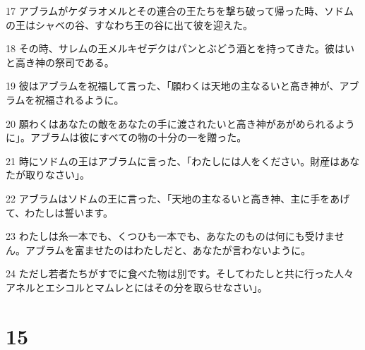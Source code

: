 \par 17 アブラムがケダラオメルとその連合の王たちを撃ち破って帰った時、ソドムの王はシャベの谷、すなわち王の谷に出て彼を迎えた。
\par 18 その時、サレムの王メルキゼデクはパンとぶどう酒とを持ってきた。彼はいと高き神の祭司である。
\par 19 彼はアブラムを祝福して言った、「願わくは天地の主なるいと高き神が、アブラムを祝福されるように。
\par 20 願わくはあなたの敵をあなたの手に渡されたいと高き神があがめられるように」。アブラムは彼にすべての物の十分の一を贈った。
\par 21 時にソドムの王はアブラムに言った、「わたしには人をください。財産はあなたが取りなさい」。
\par 22 アブラムはソドムの王に言った、「天地の主なるいと高き神、主に手をあげて、わたしは誓います。
\par 23 わたしは糸一本でも、くつひも一本でも、あなたのものは何にも受けません。アブラムを富ませたのはわたしだと、あなたが言わないように。
\par 24 ただし若者たちがすでに食べた物は別です。そしてわたしと共に行った人々アネルとエシコルとマムレとにはその分を取らせなさい」。

\chapter{15}

